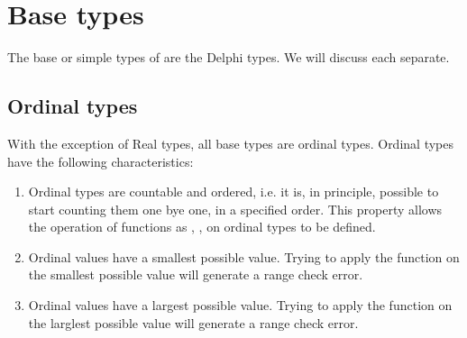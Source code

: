 \documentclass{report}
\begin{document}
\section{Base types}
The base or simple types of \fpc are the Delphi types.
We will discuss each separate.

\subsection{Ordinal types}
With the exception of Real types, all base types are ordinal types.
Ordinal types have the following characteristics:
\begin{enumerate}
\item Ordinal types are countable and ordered, i.e. it is, in principle,
possible to start counting them one bye one, in a specified order.
This property allows the operation of functions as , ,
on ordinal types to be defined.
\item Ordinal values have a smallest possible value. Trying to apply the
 function on the smallest possible value will generate a range
check error.
\item Ordinal values have a largest possible value. Trying to apply the
 function on the larglest possible value will generate a range
check error.
\end{enumerate}
\end{document}
